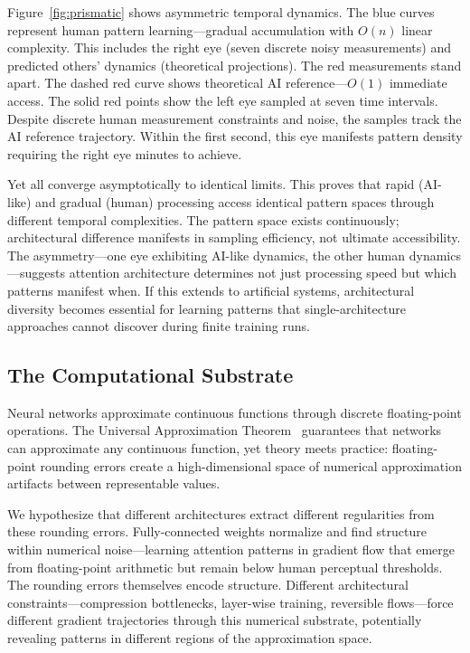 \documentclass{article}
\begin{document}
Figure~\ref{fig:prismatic} shows asymmetric temporal dynamics. The blue curves represent human pattern learning—gradual accumulation with $O(n)$ linear complexity. This includes the right eye (seven discrete noisy measurements) and predicted others' dynamics (theoretical projections). The red measurements stand apart. The dashed red curve shows theoretical AI reference—$O(1)$ immediate access. The solid red points show the left eye sampled at seven time intervals. Despite discrete human measurement constraints and noise, the samples track the AI reference trajectory. Within the first second, this eye manifests pattern density requiring the right eye minutes to achieve.

Yet all converge asymptotically to identical limits. This proves that rapid (AI-like) and gradual (human) processing access identical pattern spaces through different temporal complexities. The pattern space exists continuously; architectural difference manifests in sampling efficiency, not ultimate accessibility. The asymmetry—one eye exhibiting AI-like dynamics, the other human dynamics—suggests attention architecture determines not just processing speed but which patterns manifest when. If this extends to artificial systems, architectural diversity becomes essential for learning patterns that single-architecture approaches cannot discover during finite training runs.

\subsection{The Computational Substrate}

Neural networks approximate continuous functions through discrete floating-point operations. The Universal Approximation Theorem~\cite{hornik1989multilayer} guarantees that networks can approximate any continuous function, yet theory meets practice: floating-point rounding errors create a high-dimensional space of numerical approximation artifacts between representable values.

We hypothesize that different architectures extract different regularities from these rounding errors. Fully-connected weights normalize and find structure within numerical noise—learning attention patterns in gradient flow that emerge from floating-point arithmetic but remain below human perceptual thresholds. The rounding errors themselves encode structure. Different architectural constraints—compression bottlenecks, layer-wise training, reversible flows—force different gradient trajectories through this numerical substrate, potentially revealing patterns in different regions of the approximation space.
\end{document}

